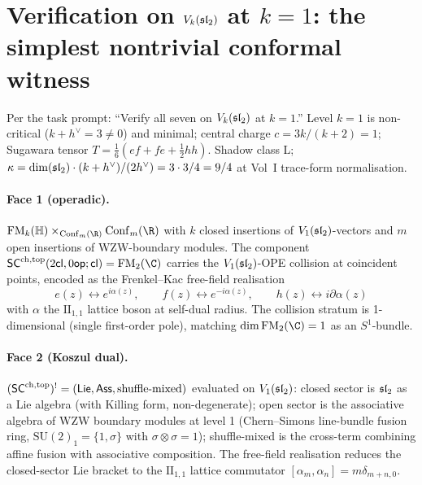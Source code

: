 \section{Verification on \texorpdfstring{$V_k(\mathfrak{sl}_2)$}{V\_k(sl\_2)} at \texorpdfstring{$k = 1$}{k=1}: the simplest nontrivial conformal witness}

Per the task prompt: ``Verify all seven on $V_k(\mathfrak{sl}_2)$ at $k = 1$.'' Level $k = 1$ is non-critical ($k + h^\vee = 3 \ne 0$) and minimal; central charge $c = 3k/(k + 2) = 1$; Sugawara tensor $T = \tfrac{1}{6}(e f + f e + \tfrac{1}{2} h h)$. Shadow class L; $\kappa = \dim(\mathfrak{sl}_2) \cdot (k + h^\vee)/(2 h^\vee) = 3 \cdot 3 / 4 = 9/4$ at Vol~I trace-form normalisation.

\paragraph{Face 1 (operadic).} $\FM_k(\mathbb H) \times_{\Conf_m(\R)} \Conf_m(\R)$ with $k$ closed insertions of $V_1(\mathfrak{sl}_2)$-vectors and $m$ open insertions of WZW-boundary modules. The component $\SCchtop(2\mathsf{cl}, 0\mathsf{op}; \mathsf{cl}) = \FM_2(\C)$ carries the $V_1(\mathfrak{sl}_2)$-OPE collision at coincident points, encoded as the Frenkel--Kac free-field realisation
\[
e(z) \leftrightarrow e^{i\alpha(z)}, \qquad f(z) \leftrightarrow e^{-i\alpha(z)}, \qquad h(z) \leftrightarrow i\partial\alpha(z)
\]
with $\alpha$ the $\mathrm{II}_{1, 1}$ lattice boson at self-dual radius. The collision stratum is 1-dimensional (single first-order pole), matching $\dim\FM_2(\C) = 1$ as an $S^1$-bundle.

\paragraph{Face 2 (Koszul dual).} $(\mathsf{SC}^{\mathrm{ch},\mathrm{top}})^! = (\mathsf{Lie}, \mathsf{Ass}, \text{shuffle-mixed})$ evaluated on $V_1(\mathfrak{sl}_2)$: closed sector is $\mathfrak{sl}_2$ as a Lie algebra (with Killing form, non-degenerate); open sector is the associative algebra of WZW boundary modules at level 1 (Chern--Simons line-bundle fusion ring, $\mathrm{SU}(2)_1 = \{1, \sigma\}$ with $\sigma \otimes \sigma = 1$); shuffle-mixed is the cross-term combining affine fusion with associative composition. The free-field realisation reduces the closed-sector Lie bracket to the $\mathrm{II}_{1, 1}$ lattice commutator $[\alpha_m, \alpha_n] = m \delta_{m + n, 0}$.

